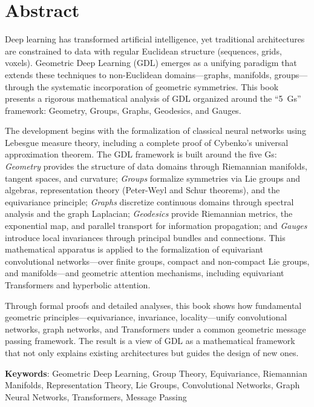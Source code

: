 \chapter*{Abstract}

Deep learning has transformed artificial intelligence, yet traditional architectures are constrained to data with regular Euclidean structure (sequences, grids, voxels). Geometric Deep Learning (GDL) emerges as a unifying paradigm that extends these techniques to non-Euclidean domains---graphs, manifolds, groups---through the systematic incorporation of geometric symmetries. This book presents a rigorous mathematical analysis of GDL organized around the ``5~Gs'' framework: Geometry, Groups, Graphs, Geodesics, and Gauges.

The development begins with the formalization of classical neural networks using Lebesgue measure theory, including a complete proof of Cybenko's universal approximation theorem. The GDL framework is built around the five Gs: \emph{Geometry} provides the structure of data domains through Riemannian manifolds, tangent spaces, and curvature; \emph{Groups} formalize symmetries via Lie groups and algebras, representation theory (Peter-Weyl and Schur theorems), and the equivariance principle; \emph{Graphs} discretize continuous domains through spectral analysis and the graph Laplacian; \emph{Geodesics} provide Riemannian metrics, the exponential map, and parallel transport for information propagation; and \emph{Gauges} introduce local invariances through principal bundles and connections. This mathematical apparatus is applied to the formalization of equivariant convolutional networks---over finite groups, compact and non-compact Lie groups, and manifolds---and geometric attention mechanisms, including equivariant Transformers and hyperbolic attention.

Through formal proofs and detailed analyses, this book shows how fundamental geometric principles---equivariance, invariance, locality---unify convolutional networks, graph networks, and Transformers under a common geometric message passing framework. The result is a view of GDL as a mathematical framework that not only explains existing architectures but guides the design of new ones.

\vspace{0.5cm}
\begin{flushleft}
	\textbf{Keywords}: Geometric Deep Learning, Group Theory, Equivariance, Riemannian Manifolds, Representation Theory, Lie Groups, Convolutional Networks, Graph Neural Networks, Transformers, Message Passing
\end{flushleft}
